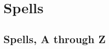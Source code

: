 \newcommand{\closerange}{Close}
\newcommand{\mediumrange}{Medium}
\newcommand{\longrange}{Long}

\newcommand{\component}[1]{\textit{Material Component:} #1}
\newcommand{\focus}[1]{\textit{Focus:} #1}


\chapter{Spells}
\section{Spells, A through Z}






